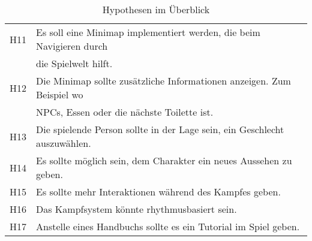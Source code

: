 \begin{center}
\begin{table}[!ht]
\begin{tabular}{ c | l}
  H11 & Es soll eine Minimap implementiert werden, die beim Navigieren durch\\
      & die Spielwelt hilft.\\
  H12 & Die Minimap sollte zusätzliche Informationen anzeigen. Zum Beispiel wo \\
      & NPCs, Essen oder die nächste Toilette ist.\\
  H13 & Die spielende Person sollte in der Lage sein, ein Geschlecht auszuwählen. \\
  H14 & Es sollte möglich sein, dem Charakter ein neues Aussehen zu geben. \\
  H15 & Es sollte mehr Interaktionen während des Kampfes geben. \\
  H16 & Das Kampfsystem könnte rhythmusbasiert sein.\\
  H17 & Anstelle eines Handbuchs sollte es ein Tutorial im Spiel geben.
\end{tabular}
\caption{Hypothesen im Überblick}
\label{table:hypothesis-overview}
\end{table}
\end{center}